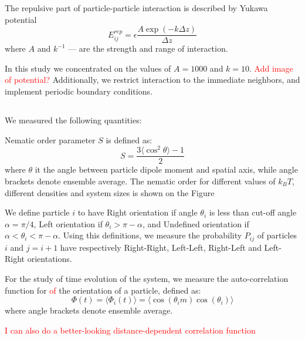 \documentclass[12pt, a4paper]{article}
\begin{document}
The repulsive part of particle-particle interaction is described by Yukawa potential
\begin{equation}
\label{eq:yukawa_interaction}
E_{ij}^{rep} = \epsilon \frac{A \exp(-k \Delta z)}{\Delta z}
\end{equation}
where $A$ and $k^{-1}$ --- are the strength and range of interaction.

In this study we concentrated on the values of $A = 1000$ and $k = 10$. \textcolor{red}{Add image of potential?}
Additionally, we restrict interaction to the immediate neighbors, and implement periodic boundary conditions.

\subsection{}
We measured the following quantities:

Nematic order parameter $S$ is defined as:
\begin{equation}
\label{eq:nematic_order_parameter}
	S = \frac{3 \langle\cos^2 \theta\rangle - 1}{2}
\end{equation}
where $\theta$ it the angle between particle dipole moment and spatial axis, while angle brackets denote ensemble average.
The nematic order for different values of $k_BT$, different densities and system sizes is shown on the Figure

We define particle $i$ to have Right orientation if angle $\theta_i$ is less than cut-off angle $\alpha = \pi/4$, Left orientation if $\theta_i > \pi - \alpha$, and Undefined orientation if $\alpha < \theta_i < \pi - \alpha$. 
Using this definitions, we measure the probability $P_{ij}$ of particles $i$ and $j = i+1$ have respectively Right-Right, Left-Left, Right-Left and Left-Right orientations.

For the study of time evolution of the system, we measure the auto-correlation function for \textcolor{red}{of} the orientation of a particle, defined as:
\begin{equation}
 \Phi(t) = \langle\Phi_i(t)\rangle = \langle\cos (\theta_i{m}) \cos (\theta_i)\rangle
\end{equation}
where angle brackets denote ensemble average.

\textcolor{red}{I can also do a better-looking distance-dependent correlation function}

\subsection{}
\end{document}
